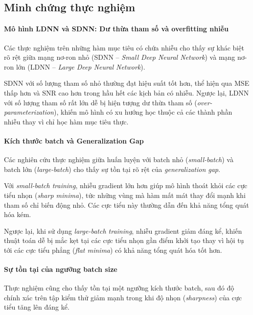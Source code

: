 \subsection{Minh chứng thực nghiệm}

\paragraph{Mô hình LDNN và SDNN: Dư thừa tham số và overfitting nhiễu \cite{poulinakis2023noisy_sparse}}

Các thực nghiệm trên những hàm mục tiêu có chứa nhiễu cho thấy sự khác biệt rõ rệt giữa mạng nơ-ron nhỏ (SDNN -- \textit{Small Deep Neural Network}) và mạng nơ-ron lớn (LDNN -- \textit{Large Deep Neural Network}).

SDNN với số lượng tham số nhỏ thường đạt hiệu suất tốt hơn, thể hiện qua MSE thấp hơn và SNR cao hơn trong hầu hết các kịch bản có nhiễu. Ngược lại, LDNN với số lượng tham số rất lớn dễ bị hiện tượng dư thừa tham số (\textit{over-parameterization}), khiến mô hình có xu hướng học thuộc cả các thành phần nhiễu thay vì chỉ học hàm mục tiêu thực.

\paragraph{Kích thước batch và Generalization Gap \cite{keskar2017largebatchtrainingdeeplearning}}

Các nghiên cứu thực nghiệm giữa huấn luyện với batch nhỏ (\textit{small-batch}) và batch lớn (\textit{large-batch}) cho thấy sự tồn tại rõ rệt của \textit{generalization gap}.

Với \textit{small-batch training}, nhiễu gradient lớn hơn giúp mô hình thoát khỏi các cực tiểu nhọn (\textit{sharp minima}), tức những vùng mà hàm mất mát thay đổi mạnh khi tham số chỉ biến động nhỏ. Các cực tiểu này thường dẫn đến khả năng tổng quát hóa kém.

Ngược lại, khi sử dụng \textit{large-batch training}, nhiễu gradient giảm đáng kể, khiến thuật toán dễ bị mắc kẹt tại các cực tiểu nhọn gần điểm khởi tạo thay vì hội tụ tới các cực tiểu phẳng (\textit{flat minima}) có khả năng tổng quát hóa tốt hơn.

\paragraph{Sự tồn tại của ngưỡng batch size \cite{keskar2017largebatchtrainingdeeplearning}}

Thực nghiệm cũng cho thấy tồn tại một ngưỡng kích thước batch, sau đó độ chính xác trên tập kiểm thử giảm mạnh trong khi độ nhọn (\textit{sharpness}) của cực tiểu tăng lên đáng kể.

